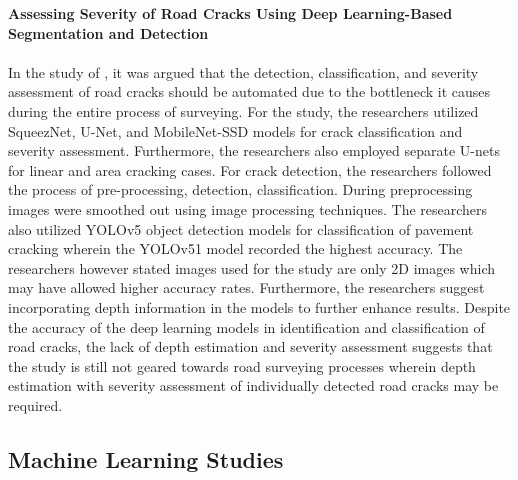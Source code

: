 \noindent\textbf{\large Assessing Severity of Road Cracks Using Deep Learning-Based Segmentation and Detection} \\\\
In the study of , it was argued that the detection, classification, and severity assessment of road cracks should be automated due to the bottleneck it causes during the entire process of surveying. For the study, the researchers utilized SqueezNet, U-Net, and MobileNet-SSD models for crack classification and severity assessment. Furthermore, the researchers also employed separate U-nets for linear and area cracking cases. For crack detection, the researchers followed the process of pre-processing, detection, classification. During preprocessing images were smoothed out using image processing techniques. The researchers also utilized YOLOv5 object detection models for classification of pavement cracking wherein the YOLOv51 model recorded the highest accuracy. The researchers however stated images used for the study are only 2D images which may have allowed higher accuracy rates. Furthermore, the researchers suggest incorporating depth information in the models to further enhance results. Despite the accuracy of the deep learning models in identification and classification of road cracks, the lack of depth estimation and severity assessment suggests that the study is still not geared towards road surveying processes wherein depth estimation with severity assessment of individually detected road cracks may be required.

\subsection{Machine Learning Studies}

